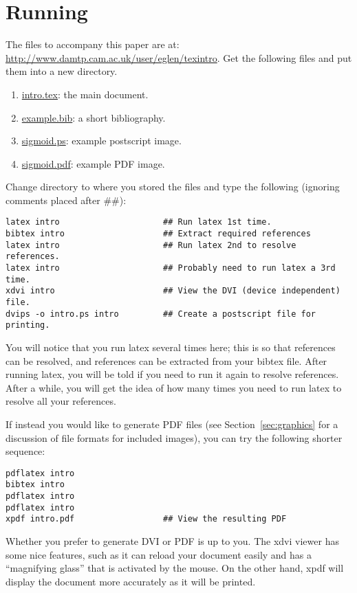 \documentclass[12pt]{article}
\begin{document}
\section{Running \latex}

The files to accompany this paper are at:
\url{http://www.damtp.cam.ac.uk/user/eglen/texintro}.  Get the
following files and put them into a new directory.

\begin{enumerate}
  \item \url{intro.tex}: the main \latex document.
  \item \url{example.bib}: a short bibliography.
  \item \url{sigmoid.ps}: example postscript image.
  \item \url{sigmoid.pdf}: example PDF image.
\end{enumerate}

Change directory to where you stored the files and type the
following (ignoring comments placed after \#\#):

\begin{verbatim}
latex intro                     ## Run latex 1st time.
bibtex intro                    ## Extract required references
latex intro                     ## Run latex 2nd to resolve references.
latex intro                     ## Probably need to run latex a 3rd time.
xdvi intro                      ## View the DVI (device independent) file.
dvips -o intro.ps intro         ## Create a postscript file for printing.
\end{verbatim}

You will notice that you run latex several times here; this is so that
references can be resolved, and references can be extracted from your
bibtex file.  After running latex, you will be told if you need to run
it again to resolve references.  After a while, you will get the idea
of how many times you need to run latex to resolve all your
references.

If instead you would like to generate PDF files (see
Section~\ref{sec:graphics} for a discussion of file formats for
included images), you can try the following shorter sequence:

\begin{verbatim}
pdflatex intro
bibtex intro
pdflatex intro
pdflatex intro
xpdf intro.pdf                  ## View the resulting PDF
\end{verbatim}

Whether you prefer to generate DVI or PDF is up to you.  The xdvi
viewer has some nice features, such as it can reload your document
easily and has a ``magnifying glass'' that is activated by the mouse.
On the other hand, xpdf will display the document more accurately as 
it will be printed.
\end{document}
